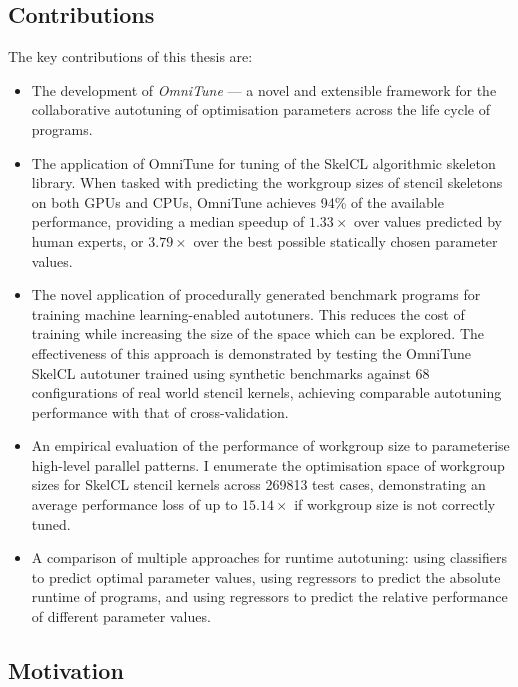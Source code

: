 \documentclass[prodmode,acmtecs]{acmsmall} %
\begin{document}
\subsection{Contributions}

The key contributions of this thesis are:

\begin{itemize}
\item The development of \emph{OmniTune} --- a novel and extensible
  framework for the collaborative autotuning of optimisation
  parameters across the life cycle of programs.
\item The application of OmniTune for tuning of the SkelCL algorithmic
  skeleton library. When tasked with predicting the workgroup sizes of
  stencil skeletons on both GPUs and CPUs, OmniTune achieves 94\% of
  the available performance, providing a median speedup of
  $1.33\times$ over values predicted by human experts, or $3.79\times$
  over the best possible statically chosen parameter values.
\item The novel application of procedurally generated benchmark
  programs for training machine learning-enabled autotuners. This
  reduces the cost of training while increasing the size of the space
  which can be explored. The effectiveness of this approach is
  demonstrated by testing the OmniTune SkelCL autotuner trained using
  synthetic benchmarks against 68 configurations of real world stencil
  kernels, achieving comparable autotuning performance with that of
  cross-validation.
\item An empirical evaluation of the performance of workgroup size to
  parameterise high-level parallel patterns. I enumerate the
  optimisation space of workgroup sizes for SkelCL stencil kernels
  across 269813 test cases, demonstrating an average performance loss
  of up to $15.14\times$ if workgroup size is not correctly tuned.
\item A comparison of multiple approaches for runtime autotuning:
  using classifiers to predict optimal parameter values, using
  regressors to predict the absolute runtime of programs, and using
  regressors to predict the relative performance of different
  parameter values.
\end{itemize}


\subsection{Motivation}
\end{document}
